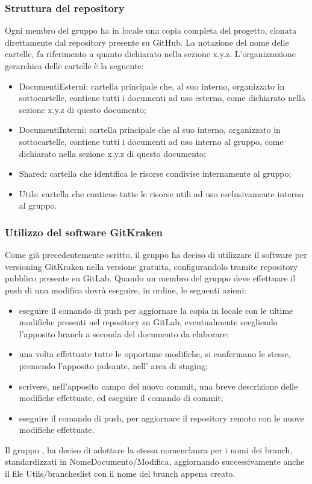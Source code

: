\subsubsection{Struttura del repository}
Ogni membro del gruppo {\Gruppo} ha in locale una copia completa del progetto, clonata direttamente dal repository presente su GitHub. La notazione del nome delle cartelle, fa riferimento a quanto dichiarato nella sezione x.y.z. L’organizzazione gerarchica delle cartelle è la seguente:
\begin{itemize}
	\item DocumentiEsterni: cartella principale che, al suo interno, organizzato in sottocartelle, contiene tutti i documenti ad uso esterno, come dichiarato nella sezione x.y.z di questo documento;
	\item DocumentiInterni: cartella principale che al suo interno, organizzato in sottocartelle, contiene tutti i documenti ad uso interno al gruppo, come dichiarato nella sezione x.y.z di questo documento;
	\item Shared: cartella che identifica le risorse condivise internamente al gruppo;
	\item Utils: cartella che contiene tutte le risorse utili ad uso esclusivamente interno al gruppo.
\end{itemize}

\subsubsection{Utilizzo del software GitKraken}
Come già precedentemente scritto, il gruppo {\Gruppo} ha deciso di utilizzare il software per versioning GitKraken nella versione gratuita, configurandolo tramite repository pubblico presente su GitLab. Quando un membro del gruppo deve effettuare il push di una modifica dovrà eseguire, in ordine, le seguenti azioni:
\begin{itemize}
	\item eseguire il comando di push per aggiornare la copia in locale con le ultime modifiche presenti nel repository su GitLab, eventualmente scegliendo l’apposito branch a seconda del documento da elaborare;
	\item una volta effettuate tutte le opportune modifiche, si confermano le stesse, premendo l’apposito pulsante, nell’ area di staging;
	\item scrivere, nell’apposito campo del nuovo commit, una breve descrizione delle modifiche effettuate, ed eseguire il comando di commit;
	\item eseguire il comando di push, per aggiornare il repository remoto con le nuove modifiche effettuate.
\end{itemize}
Il gruppo {\Gruppo}, ha deciso di adottare la stessa nomenclaura per i nomi dei branch, standardizzati in NomeDocumento/Modifica, aggiornando successivamente anche il file Utils/brancheslist con il nome del branch appena creato.

